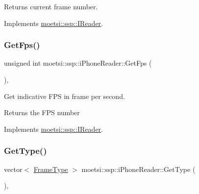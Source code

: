 \begin{DoxyReturn}{Returns}
current frame number. 
\end{DoxyReturn}


Implements \hyperlink{classmoetsi_1_1ssp_1_1IReader_ac292d83eb06dee277baaa06e281a562d}{moetsi\+::ssp\+::\+I\+Reader}.

\mbox{\label{classmoetsi_1_1ssp_1_1iPhoneReader_a4bb216847a6c2ed8eb5d31788a0b8477}} 
\subsubsection{\texorpdfstring{Get\+Fps()}{GetFps()}}
{\footnotesize\ttfamily unsigned int moetsi\+::ssp\+::i\+Phone\+Reader\+::\+Get\+Fps (\begin{DoxyParamCaption}{ }\end{DoxyParamCaption})\hspace{0.3cm}{\ttfamily [override]}, {\ttfamily [virtual]}}



Get indicative F\+PS in frame per second. 

\begin{DoxyReturn}{Returns}
the F\+PS number 
\end{DoxyReturn}


Implements \hyperlink{classmoetsi_1_1ssp_1_1IReader_a9f6a8650ca290b011b8e5451eeae9f32}{moetsi\+::ssp\+::\+I\+Reader}.

\mbox{\label{classmoetsi_1_1ssp_1_1iPhoneReader_a05d285ace85fc570bc2f453a0862ae56}} 
\subsubsection{\texorpdfstring{Get\+Type()}{GetType()}}
{\footnotesize\ttfamily vector$<$ \hyperlink{namespacemoetsi_1_1ssp_a46efdfa2cd5a28ead465dcc8006b5a87}{Frame\+Type} $>$ moetsi\+::ssp\+::i\+Phone\+Reader\+::\+Get\+Type (\begin{DoxyParamCaption}{ }\end{DoxyParamCaption})\hspace{0.3cm}{\ttfamily [override]}, {\ttfamily [virtual]}}



